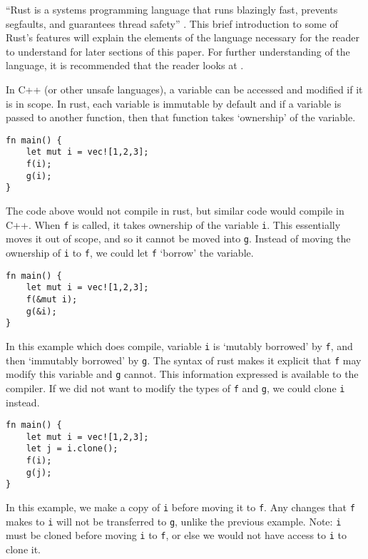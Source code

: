 \documentclass[conference]{IEEEtran}
\begin{document}
``Rust is a systems programming language that runs blazingly fast, prevents segfaults, and guarantees thread safety'' \parencite{rustlang}. This brief introduction to some of Rust's features will explain the elements of the language necessary for the reader to understand for later sections of this paper. For further understanding of the language, it is recommended that the reader looks at \textcite{rustbook}.

In C++ (or other unsafe languages), a variable can be accessed and modified if it is in scope. In rust, each variable is immutable by default and if a variable is passed to another function, then that function takes `ownership' of the variable.

\begin{verbatim}
fn main() {
    let mut i = vec![1,2,3];
    f(i);
    g(i);
}
\end{verbatim}

The code above would not compile in rust, but similar code would compile in C++. When \texttt{f} is called, it takes ownership of the variable \texttt{i}. This essentially moves it out of scope, and so it cannot be moved into \texttt{g}. Instead of moving the ownership of \texttt{i} to \texttt{f}, we could let \texttt{f} `borrow' the variable.

\begin{verbatim}
fn main() {
    let mut i = vec![1,2,3];
    f(&mut i);
    g(&i);
}
\end{verbatim}

In this example which does compile, variable \texttt{i} is `mutably borrowed' by \texttt{f}, and then `immutably borrowed' by \texttt{g}. The syntax of rust makes it explicit that \texttt{f} may modify this variable and \texttt{g} cannot. This information expressed is available to the compiler. If we did not want to modify the types of \texttt{f} and \texttt{g}, we could clone \texttt{i} instead.

\begin{verbatim}
fn main() {
    let mut i = vec![1,2,3];
    let j = i.clone();
    f(i);
    g(j);
}
\end{verbatim}

In this example, we make a copy of \texttt{i} before moving it to \texttt{f}. Any changes that \texttt{f} makes to \texttt{i} will not be transferred to \texttt{g}, unlike the previous example. Note: \texttt{i} must be cloned before moving \texttt{i} to \texttt{f}, or else we would not have access to \texttt{i} to clone it.
\end{document}
